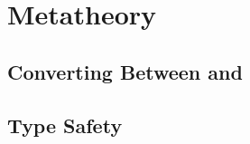 \chapter{Metatheory}
\label{chp:metatheory}

\section{Converting Between \wasm and \name}



\section{Type Safety}
\label{sec:typesafety}



